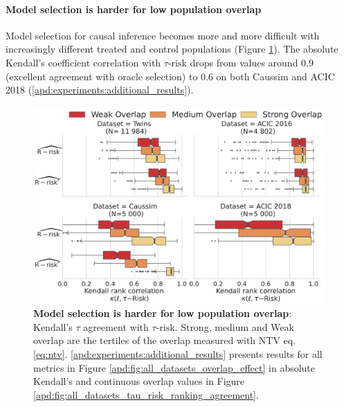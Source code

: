 \documentclass[11pt]{article}
\begin{document}
\paragraph{Model selection is harder for low population
    overlap}

Model selection for causal inference becomes more and more difficult with
increasingly different treated and control populations (Figure
\ref{fig:all_datasets_overlap_effect_r_risk}). The absolute Kendall's
coefficient correlation with $\tau\text{-risk}$ drops from values around 0.9
(excellent agreement with oracle selection) to 0.6 on both Caussim and ACIC 2018
(\ref{apd:experiments:additional_results}).

\begin{figure}[!h]
    \centering\begin{minipage}{.75\linewidth}
    \includegraphics[width=\linewidth]{images/_2_overlap_influence_overlap_by_bin_comparaison_kendall_by_Dataset_r_risk_only_twocols.pdf}
    \end{minipage}
    \caption{\textbf{Model selection is harder for low population
            overlap}:
        Kendall's $\tau$ agreement with $\tau\text{-risk}$. Strong, medium and Weak overlap
        are the tertiles of the overlap measured with NTV eq. \ref{eq:ntv}. \ref{apd:experiments:additional_results} presents results for all
        metrics in Figure \ref{apd:fig:all_datasets_overlap_effect} in absolute
        Kendall's and continuous overlap values in Figure
            {\ref{apd:fig:all_datasets_tau_risk_ranking_agreement}}.}\label{fig:all_datasets_overlap_effect_r_risk}
\end{figure}
\end{document}
